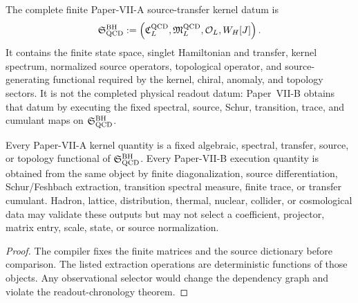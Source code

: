 \documentclass[12pt,a4paper]{article}
\begin{document}
\begin{definition}
\label{p10:def:complete-finite-qcd-source-transfer-datum}
The complete finite Paper-VII-A source-transfer kernel datum is
\begin{equation}
\label{p10:eq:complete-finite-qcd-source-transfer-object}
\mathfrak S_{\rm QCD}^{\rm BH}
:=
\left(
\mathfrak C_L^{\rm QCD},
\mathfrak M_L^{\rm QCD},
\mathcal O_L,
W_H[J]
\right).
\end{equation}
It contains the finite state space, singlet Hamiltonian and transfer, kernel spectrum,
normalized source operators, topological operator, and source-generating
functional required by the kernel, chiral, anomaly, and topology sectors.  It is
not the completed physical readout datum: Paper~VII-B obtains that datum by executing
the fixed spectral, source, Schur, transition, trace, and cumulant maps on
\(\mathfrak S_{\rm QCD}^{\rm BH}\).
\end{definition}

\begin{theorem}
\label{p10:thm:master-finite-nonperturbative-qcd-closure}
\label{p10:thm:no-observational-input-covered-qcd-sectors}
Every Paper-VII-A kernel quantity is a fixed algebraic, spectral, transfer, source,
or topology functional of \(\mathfrak S_{\rm QCD}^{\rm BH}\).  Every Paper-VII-B
execution quantity is obtained from the same object by finite diagonalization,
source differentiation, Schur/Feshbach extraction, transition spectral measure,
finite trace, or transfer cumulant.  Hadron, lattice, distribution, thermal,
nuclear, collider, or cosmological data may validate these outputs but may not
select a coefficient, projector, matrix entry, scale, state, or source
normalization.
\end{theorem}
\begin{proof}
The compiler fixes the finite matrices and the source dictionary before
comparison.  The listed extraction operations are deterministic functions of
those objects.  Any observational selector would change the dependency graph
and violate the readout-chronology theorem.
\end{proof}
\end{document}

